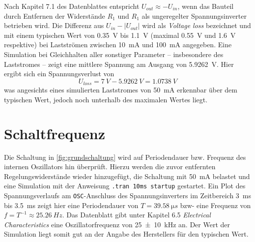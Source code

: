 		Nach Kapitel 7.1 des Datenblattes entspricht \(U_{out} \approx -U_{in}\), wenn das Bauteil durch Entfernen der Widerstände \(R_1\) und \(R_1\)
		als ungeregelter Spannungsinverter betrieben wird. Die Differenz aus \(U_{in} - |U_{out}|\) wird als
		\textit{Voltage loss} bezeichnet und mit einem typischen Wert von \SI{0,35}{V} bis \SI{1,1}{V} (maximal \SI{0,55}{V} und \SI{1,6}{V} respektive)
		bei Lastströmen zwischen \SI{10}{mA} und \SI{100}{mA} angegeben.
		Eine Simulation bei Gleichhalten aller sonstiger Parameter -- insbesondere des Laststromes -- zeigt eine mittlere Spannung am Ausgang von \SI{5,9262}{V}.
		Hier ergibt sich ein Spannungsverlust von
		\begin{equation}
			U_{loss} = \SI{7}{V} - \SI{5,9262}{V} = \SI{1,0738}{V}
			\label{eq:voltage loss}
		\end{equation}
		was angesichts eines simulierten Laststromes von \SI{50}{mA} erkennbar über dem typischen Wert, jedoch noch unterhalb des maximalen Wertes liegt.
	\section{Schaltfrequenz}
		Die Schaltung in \cref{fig:grundschaltung} wird auf Periodendauer bzw. Frequenz des internen Oszillators hin überprüft.
		Hierzu werden die zuvor entfernten Regelungswiderstände wieder hinzugefügt, die Schaltung mit \SI{50}{mA} belastet
		und eine Simulation mit der Anweisung \texttt{.tran 10ms startup} gestartet. Ein Plot des Spannungsverlaufs am
		\texttt{OSC}-Anschluss des Spannungsinverters im Zeitbereich \SI{3}{ms} bis \SI{3,5}{ms} zeigt hier eine Periodendauer von
		\(T = \SI{39,58}{\micro s}\) bzw- eine Frequenz von \(f = T^{-1} \approx \SI{25,26}{Hz}\). Das Datenblatt gibt unter Kapitel 6.5
		\textit{Electrical Characteristics} eine Oszillatorfrequenz von \SI{25 \pm 10}{kHz} an. Der Wert der Simulation liegt somit gut
		an der Angabe des Herstellers für den typischen Wert.
